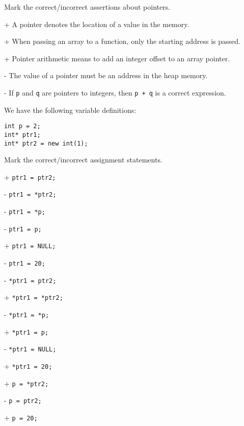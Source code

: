 Mark the correct/incorrect assertions about pointers.

+ A pointer denotes the location of a value in the memory.

+ When passing an array to a function, only the starting address is passed.

+ Pointer arithmetic means to add an integer offset to an array pointer.

- The value of a pointer must be an address in the heap memory.

- If \verb|p| and \verb|q| are pointers to integers, then \verb|p + q| is a correct expression.

We have the following variable definitions:
 \vspace{-3mm}\begin{verbatim}
int p = 2;
int* ptr1;
int* ptr2 = new int(1);
 \end{verbatim}\vspace{-6mm}
Mark the correct/incorrect assignment statements.

+ \verb|ptr1 = ptr2;|

- \verb|ptr1 = *ptr2;|

- \verb|ptr1 = *p;|

- \verb|ptr1 = p;|

+ \verb|ptr1 = NULL;|

- \verb|ptr1 = 20;|

- \verb|*ptr1 = ptr2;|

+ \verb|*ptr1 = *ptr2;|

- \verb|*ptr1 = *p;|

+ \verb|*ptr1 = p;|

- \verb|*ptr1 = NULL;|

+ \verb|*ptr1 = 20;|

+ \verb|p = *ptr2;|

- \verb|p = ptr2;|

+ \verb|p = 20;|

